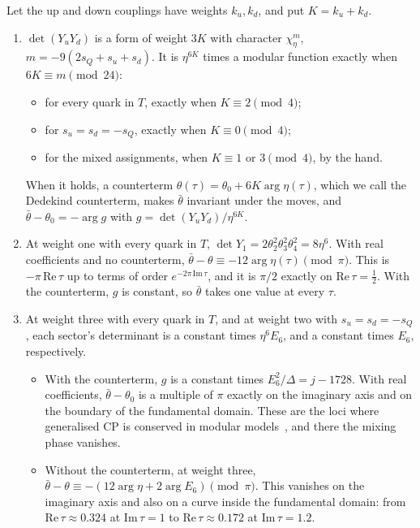 \begin{proposition}\label{prop:strong}
Let the up and down couplings have weights $k_u,k_d$, and put $K=k_u+k_d$.
\begin{enumerate}
\item $\det(Y_uY_d)$ is a form of weight $3K$ with character $\chi_\eta^{m}$, $m=-9(2s_Q+s_u+s_d)$. It is $\eta^{6K}$ times
  a modular function exactly when $6K\equiv m\pmod{24}$:
  \begin{itemize}
  \item for every quark in $T$, exactly when $K\equiv2\pmod 4$;
  \item for $s_u=s_d=-s_Q$, exactly when $K\equiv0\pmod 4$;
  \item for the mixed assignments, when $K\equiv1$ or $3\pmod4$, by the hand.
  \end{itemize}
  When it holds, a counterterm $\theta(\tau)=\theta_0+6K\arg\eta(\tau)$, which we call the Dedekind counterterm, makes
  $\bar\theta$ invariant under the moves, and $\bar\theta-\theta_0=-\arg g$ with $g=\det(Y_uY_d)/\eta^{6K}$.
\item At weight one with every quark in $T$, $\det Y_1=2\theta_2^2\theta_3^2\theta_4^2=8\eta^6$. With real coefficients
  and no counterterm, $\bar\theta-\theta\equiv-12\arg\eta(\tau)\pmod\pi$. This is $-\pi\,\mathrm{Re}\,\tau$ up to terms
  of order $e^{-2\pi\,\mathrm{Im}\,\tau}$, and it is $\pi/2$ exactly on $\mathrm{Re}\,\tau=\tfrac12$. With the counterterm,
  $g$ is constant, so $\bar\theta$ takes one value at every $\tau$.
\item At weight three with every quark in $T$, and at weight two with $s_u=s_d=-s_Q$, each sector's determinant is a
  constant times $\eta^6E_6$, and a constant times $E_6$, respectively.
  \begin{itemize}
  \item With the counterterm, $g$ is a constant times $E_6^2/\Delta=j-1728$. With real coefficients, $\bar\theta-\theta_0$
    is a multiple of $\pi$ exactly on the imaginary axis and on the boundary of the fundamental domain. These are the
    loci where generalised CP is conserved in modular models~\cite{NovichkovPenedoPetcovTitov2019}, and there the mixing
    phase vanishes.
  \item Without the counterterm, at weight three, $\bar\theta-\theta\equiv-(12\arg\eta+2\arg E_6)\pmod\pi$. This vanishes
    on the imaginary axis and also on a curve inside the fundamental domain: from $\mathrm{Re}\,\tau\approx0.324$ at
    $\mathrm{Im}\,\tau=1$ to $\mathrm{Re}\,\tau\approx0.172$ at $\mathrm{Im}\,\tau=1.2$.
  \end{itemize}
\end{enumerate}
\end{proposition}
